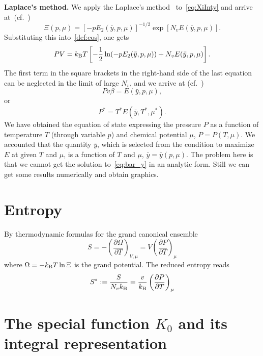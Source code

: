 \documentclass[12pt]{article}
\numberwithin{equation}{section}
\begin{document}
	\textbf{Laplace's method.} We apply the Laplace's method~\cite[(1.21)]{Fedoryuk89} to~\eqref{eq:XiInty} and arrive at~(cf.~\cite[(19)]{KD22})
	\begin{equation}
		\Xi(p,\mu) = [-p E_2(\bar{y},p,\mu)]^{-1/2} \exp[N_v E(\bar{y},p,\mu)].
	\end{equation}
	Substituting this into~\eqref{def:eos}, one gets
	\begin{equation}
		P V = k_{\rm B}T \left[-\frac{1}{2} \ln(-p E_2(\bar{y},p,\mu)) + N_v E(\bar{y},p,\mu)\right].
	\end{equation}
	The first term in the square brackets in the right-hand side of the last equation can be neglected in the limit of large $N_v$, and we arrive at (cf.~\cite[(2.27)]{KKD20})
	\begin{equation}
		P v \beta = E(\bar{y},p,\mu),
	\end{equation}
	or
	\begin{equation}
		P^* = T^* E(\bar{y},T^*,\mu^*).
	\end{equation}
	We have obtained the equation of state expressing the pressure $P$ as a function of temperature $T$ (through variable $p$) and chemical potential $\mu$, $P = P(T, \mu)$. We accounted that the quantity $\bar{y}$, which is selected from the condition to maximize $E$ at given $T$ and $\mu$, is a function of $T$ and $\mu$, $\bar{y} = \bar{y}(p,\mu)$. The problem here is that we cannot get the solution to~\eqref{eq:bar_y} in an analytic form. Still we can get some results numerically and obtain graphics.
	
	
	\section{Entropy}
	By thermodynamic formulas for the grand canonical ensemble
	\begin{equation}
		S = -\left(\frac{\partial \Omega}{\partial T}\right)_{V,\mu} = V\left(\frac{\partial P}{\partial T}\right)_{\mu}
	\end{equation}
	where $\Omega = -k_{\rm B}T \ln \Xi$ is the grand potential. The reduced entropy reads
	\begin{equation}
		S^* := \frac{S}{N_v k_{\rm B}} = \frac{v}{k_{\rm B}} \left(\frac{\partial P}{\partial T}\right)_{\mu}
	\end{equation}
	
	
	
	\section{The special function $K_0$ and its integral representation}
	
\end{document}
